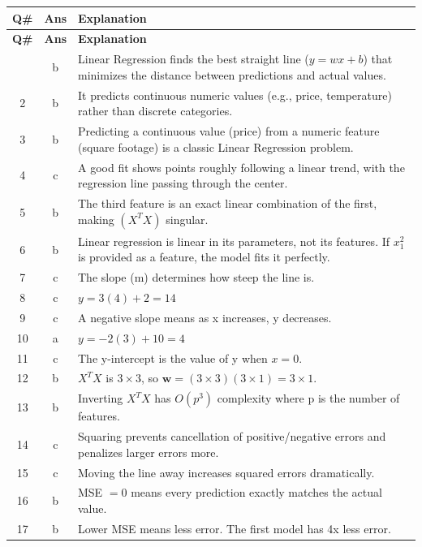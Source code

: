 \documentclass[12pt, a4paper]{article}
\begin{document}
\begin{longtable}{|c|c|p{9.5cm}|}
\hline
\textbf{Q\#} & \textbf{Ans} & \textbf{Explanation} \\
\hline
\endfirsthead
\hline
\textbf{Q\#} & \textbf{Ans} & \textbf{Explanation} \\
\hline
\endhead
\hline
\endfoot
1 & b & Linear Regression finds the best straight line ($y = wx + b$) that minimizes the distance between predictions and actual values. \\
\hline
2 & b & It predicts continuous numeric values (e.g., price, temperature) rather than discrete categories. \\
\hline
3 & b & Predicting a continuous value (price) from a numeric feature (square footage) is a classic Linear Regression problem. \\
\hline
4 & c & A good fit shows points roughly following a linear trend, with the regression line passing through the center. \\
\hline
5 & b & The third feature is an exact linear combination of the first, making $(X^TX)$ singular. \\
\hline
6 & b & Linear regression is linear in its parameters, not its features. If $x_1^2$ is provided as a feature, the model fits it perfectly. \\
\hline
7 & c & The slope (m) determines how steep the line is. \\
\hline
8 & c & $y = 3(4) + 2 = 14$ \\
\hline
9 & c & A negative slope means as x increases, y decreases. \\
\hline
10 & a & $y = -2(3) + 10 = 4$ \\
\hline
11 & c & The y-intercept is the value of y when $x = 0$. \\
\hline
12 & b & $X^TX$ is $3\times3$, so $\mathbf{w} = (3\times3)(3\times1) = 3\times1$. \\
\hline
13 & b & Inverting $X^TX$ has $O(p^3)$ complexity where p is the number of features. \\
\hline
14 & c & Squaring prevents cancellation of positive/negative errors and penalizes larger errors more. \\
\hline
15 & c & Moving the line away increases squared errors dramatically. \\
\hline
16 & b & MSE $= 0$ means every prediction exactly matches the actual value. \\
\hline
17 & b & Lower MSE means less error. The first model has 4x less error. \\

\end{longtable}
\end{document}
